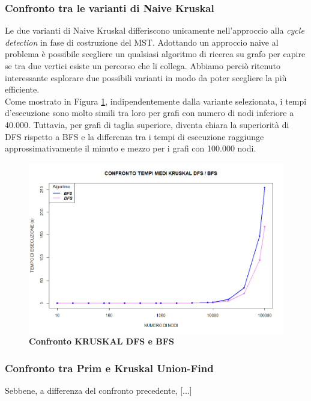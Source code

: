 \documentclass[]{article}
\begin{document}
\begin{flushleft}


\subsubsection{Confronto tra le varianti di Naive Kruskal}
Le due varianti di Naive Kruskal differiscono unicamente nell'approccio alla \textit{cycle detection} in fase di costruzione del MST. Adottando un approccio naive al problema è possibile scegliere un qualsiasi algoritmo di ricerca su grafo per capire se tra due vertici esiste un percorso che li collega. Abbiamo perciò ritenuto interessante esplorare due possibili varianti in modo da poter scegliere la più efficiente.\\
Come mostrato in Figura \ref{dfs-bfs}, indipendentemente dalla variante selezionata, i tempi d'esecuzione sono molto simili tra loro per grafi con numero di nodi inferiore a 40.000. Tuttavia, per grafi di taglia superiore, diventa chiara la superiorità di DFS rispetto a BFS e la differenza tra i tempi di esecuzione raggiunge approssimativamente il minuto e mezzo per i grafi con 100.000 nodi.
\begin{figure}[h]
	
	\includegraphics[width=\textwidth,height=\textheight,keepaspectratio]{COMPARE_2.png}
	\caption{\textbf{Confronto KRUSKAL DFS e BFS}}
	\label{dfs-bfs}
\end{figure}
\subsubsection{Confronto tra Prim e Kruskal Union-Find}
Sebbene, a differenza del confronto precedente, [...]
\begin{figure}[h]


\end{figure}
\end{flushleft}
\end{document}
